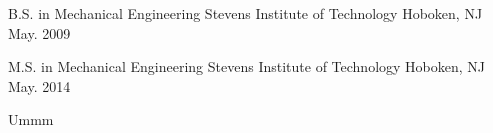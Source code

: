 

\begin{cventries}

  \cventry
    {B.S. in Mechanical Engineering} %
    {Stevens Institute of Technology} %
    {Hoboken, NJ} %
    {May. 2009} %
    {
      \begin{cvitems} %
      \end{cvitems}
    }

  \cventry
    {M.S. in Mechanical Engineering} %
    {Stevens Institute of Technology} %
    {Hoboken, NJ} %
    {May. 2014} %
    {
      \begin{cvitems} %
        \item {Ummm}
      \end{cvitems}
    }
\end{cventries}
